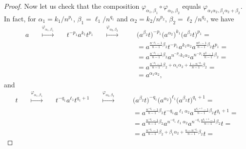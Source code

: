 \documentclass[english]{amsart}
\theoremstyle{definition}
\begin{document}
\begin{proof}
Now let us check that the composition $\varphi_{\alpha_1, \beta_1} \circ \varphi_{\alpha_2, \beta_2}$ equals $\varphi_{\alpha_1\alpha_2, \beta_1\alpha_2+\beta_2}$. In fact, for $\alpha_1=k_1/n^{p_1}$, $\beta_1=\ell_1/n^{q_1}$ and $\alpha_2=k_2/n^{p_2}$, $\beta_2=\ell_2/n^{q_2}$, we have
 \begin{align*}
a \stackrel{\varphi_{\alpha_1, \beta_1}}{\qquad\mapsto\qquad} t^{-p_1} a^{k_1} t^{p_1} \stackrel{\varphi_{\alpha_2, \beta_2}}{\qquad\mapsto\qquad} & \big( a^{\beta_2} t\big)^{-p_1} \big( a^{\alpha_2}\big)^{k_1} \big( a^{\beta_2} t\big)^{p_1}= \\ &= a^{\frac{n^{-p_1}-1}{n-1}\beta_2} t^{-p_1} a^{k_1\alpha_2} a^{\frac{n^{p_1}-1}{n-1}\beta_2} t^{p_1}= \\ &= a^{\frac{n^{-p_1}-1}{n-1}\beta_2} a^{n^{-p_1} k_1\alpha_2} a^{n^{-p_1}\frac{n^{p_1}-1}{n-1}\beta_2}= \\ &= a^{\frac{n^{-p_1}-1}{n-1}\beta_2+\alpha_1\alpha_2+\frac{1-n^{-p_1}}{n-1}\beta_2}= \\ &= a^{\alpha_1\alpha_2},
 \end{align*}
and
\begin{align*}
t \stackrel{\varphi_{\alpha_1, \beta_1}}{\qquad\mapsto\qquad} t^{-q_1} a^{\ell_1} t^{q_1+1} \stackrel{\varphi_{\alpha_2, \beta_2}}{\qquad\mapsto\qquad} & \big( a^{\beta_2} t\big)^{-q_1} \big( a^{\alpha_2} \big)^{\ell_1} \big( a^{\beta_2} t\big)^{q_1+1}= \\ &= a^{\frac{n^{-q_1}-1}{n-1}\beta_2} t^{-q_1} a^{\ell_1\alpha_2} a^{\frac{n^{q_1+1}-1}{n-1}\beta_2} t^{q_1+1}= \\ &= a^{\frac{n^{-q_1}-1}{n-1}\beta_2} a^{n^{-q_1}\ell_1\alpha_2} a^{n^{-q_1}\frac{n^{q_1+1}-1}{n-1}\beta_2} t= \\ &= a^{\frac{n^{-q_1}-1}{n-1}\beta_2+\beta_1\alpha_2+\frac{n-n^{-q_1}}{n-1}\beta_2} t= 

\end{align*}
\end{proof}
\end{document}
